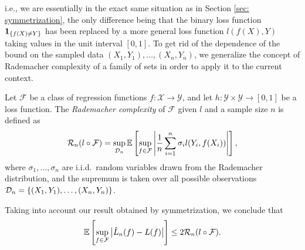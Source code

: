 i.e., we are essentially in the exact same situation as in Section \ref{sec: symmetrization}, the only difference being that the binary loss function $\mathbf{1}_{\left\{f(X) \neq Y\right\}}$ has been replaced by a more general loss function $l(f(X), Y)$ taking values in the unit interval $[0, 1]$. To get rid of the dependence of the bound on the sampled data $(X_1, Y_1), \dots, (X_n, Y_n)$, we generalize the concept of Rademacher complexity of a family of sets in order to apply it to the current context.

\begin{definition}
\label{def: rademacher complexity for general loss}
Let $\mathcal{F}$ be a class of regression functions $f \colon \mathcal{X} \to \mathcal{Y}$, and let $h \colon \mathcal{Y} \times \mathcal{Y} \to [0, 1]$ be a loss function. The \emph{Rademacher complexity} of $\mathcal{F}$ given $l$ and a sample size $n$ is defined as
\[
    \mathcal{R}_n(l \circ \mathcal{F}) = \sup_{\mathcal{D}_n} \mathbb{E}\left[ \sup_{f \in \mathcal{F}} \abs{\frac{1}{n} \sum_{i=1}^n \sigma_i l(Y_i, f(X_i))}\right],
\]
where $\sigma_1, \dots, \sigma_n$ are i.i.d.\ random variables drawn from the Rademacher distribution, and the supremum is taken over all possible observations $\mathcal{D}_n = \left\{(X_1, Y_1), \dots, (X_n, Y_n)\right\}$.
\end{definition}
Taking into account our result obtained by symmetrization, we conclude that
\[
    \mathbb{E}\left[ \sup_{f \in \mathcal{F}} \big\lvert\hat L_n(f) - L(f)\big\rvert \right] \leq 2 \mathcal{R}_n(l \circ \mathcal{F}).
\]

